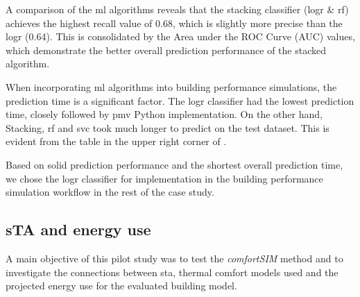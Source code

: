 A comparison of the \gls{ml} algorithms reveals that the stacking classifier (\gls{logr} \& \gls{rf}) achieves the highest recall value of 0.68, which is slightly more precise than the \gls{logr} (0.64). This is consolidated by the Area under the ROC Curve (AUC) values, which demonstrate the better overall prediction performance of the stacked algorithm.

When incorporating \gls{ml} algorithms into building performance simulations, the prediction time is a significant factor. The \gls{logr} classifier had the lowest prediction time, closely followed by \gls{pmv} Python implementation. On the other hand, Stacking, \gls{rf} and \gls{svc} took much longer to predict on the test dataset. This is evident from the table in the upper right corner of .

Based on solid prediction performance and the shortest overall prediction time, we chose the \gls{logr} classifier for implementation in the building performance simulation workflow in the rest of the case study.



\subsection{sTA and energy use}

A main objective of this pilot study was to test the \textit{comfortSIM} method and to investigate the connections between \gls{sta}, thermal comfort models used and the projected energy use for the evaluated building model.



